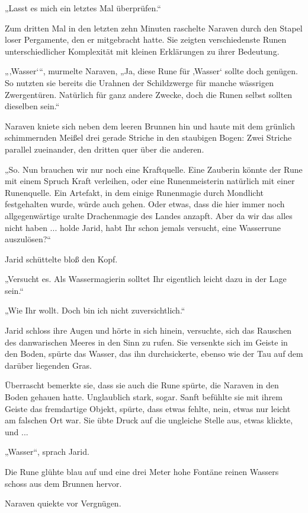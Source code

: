 „Lasst es mich ein letztes Mal überprüfen.“

Zum dritten Mal in den letzten zehn Minuten raschelte Naraven durch den Stapel loser Pergamente, den er mitgebracht hatte. Sie zeigten verschiedenste Runen unterschiedlicher Komplexität mit kleinen Erklärungen zu ihrer Bedeutung.

„‚Wasser‘“, murmelte Naraven, „Ja, diese Rune für ‚Wasser‘ sollte doch genügen. So nutzten sie bereits die Urahnen der Schildzwerge für manche wässrigen Zwergentüren. Natürlich für ganz andere Zwecke, doch die Runen selbst sollten dieselben sein.“

Naraven kniete sich neben dem leeren Brunnen hin und haute mit dem grünlich schimmernden Meißel drei gerade Striche in den staubigen Bogen: Zwei Striche parallel zueinander, den dritten quer über die anderen.

„So. Nun brauchen wir nur noch eine Kraftquelle. Eine Zauberin könnte der Rune mit einem Spruch Kraft verleihen, oder eine Runenmeisterin natürlich mit einer Runenquelle. Ein Artefakt, in dem einige Runenmagie durch Mondlicht festgehalten wurde, würde auch gehen. Oder etwas, dass die hier immer noch allgegenwärtige uralte Drachenmagie des Landes anzapft. Aber da wir das alles nicht haben ... holde Jarid, habt Ihr schon jemals versucht, eine Wasserrune auszulösen?“

Jarid schüttelte bloß den Kopf.

„Versucht es. Als Wassermagierin solltet Ihr eigentlich leicht dazu in der Lage sein.“

„Wie Ihr wollt. Doch bin ich nicht zuversichtlich.“

Jarid schloss ihre Augen und hörte in sich hinein, versuchte, sich das Rauschen des danwarischen Meeres in den Sinn zu rufen. Sie versenkte sich im Geiste in den Boden, spürte das Wasser, das ihn durchsickerte, ebenso wie der Tau auf dem darüber liegenden Gras.

Überrascht bemerkte sie, dass sie auch die Rune spürte, die Naraven in den Boden gehauen hatte. Unglaublich stark, sogar. Sanft befühlte sie mit ihrem Geiste das fremdartige Objekt, spürte, dass etwas fehlte, nein, etwas nur leicht am falschen Ort war. Sie übte Druck auf die ungleiche Stelle aus, etwas klickte, und ...

„Wasser“, sprach Jarid.

Die Rune glühte blau auf und eine drei Meter hohe Fontäne reinen Wassers schoss aus dem Brunnen hervor.

Naraven quiekte vor Vergnügen.

